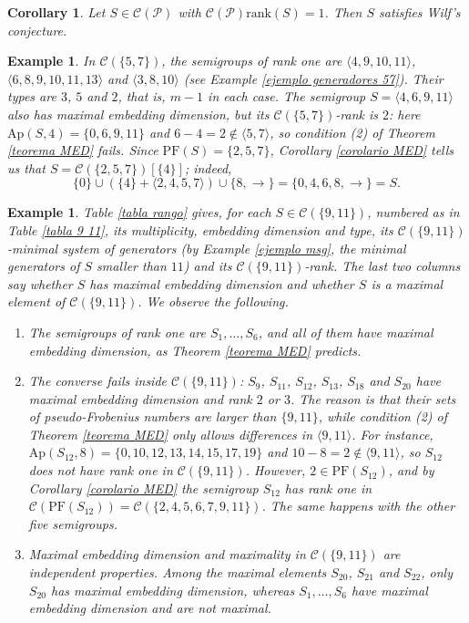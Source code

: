 \documentclass[11pt]{article}
\newtheorem{corollary}[theorem]{Corollary}
\newtheorem{example}[theorem]{Example}
\numberwithin{equation}{section}
\newcommand{\CP}{\mathcal C(\mathcal P)}
\newcommand{\rk}{\mathrm{rank}}
\newcommand{\Ap}{\mathrm{Ap}}
\newcommand{\PF}{\mathrm{PF}}
\begin{document}
\begin{corollary}\label{corolario Wilf}
Let $S\in\CP$ with $\CP\rk(S)=1$. Then $S$ satisfies Wilf's conjecture.
\end{corollary}

\begin{example}\label{ejemplo rango uno 57}
In $\mathcal C(\{5,7\})$, the semigroups of rank one are $\langle 4,9,10,11\rangle$, $\langle 6,8,9,10,11,13\rangle$ and $\langle 3,8,10\rangle$ (see Example \ref{ejemplo generadores 57}). Their types are $3$, $5$ and $2$, that is, $m-1$ in each case. The semigroup $S=\langle 4,6,9,11\rangle$ also has maximal embedding dimension, but its $\mathcal C(\{5,7\})$-rank is $2$: here $\Ap(S,4)=\{0,6,9,11\}$ and $6-4=2\notin\langle 5,7\rangle$, so condition (2) of Theorem \ref{teorema MED} fails. Since $\PF(S)=\{2,5,7\}$, Corollary \ref{corolario MED} tells us that $S=\mathcal C(\{2,5,7\})[\{4\}]$; indeed,
\[
\{0\}\cup(\{4\}+\langle 2,4,5,7\rangle)\cup\{8,\rightarrow\}=\{0,4,6,8,\rightarrow\}=S.
\]
\end{example}

\begin{example}\label{ejemplo tabla rango}
Table \ref{tabla rango} gives, for each $S\in\mathcal C(\{9,11\})$, numbered as in Table \ref{tabla 9 11}, its multiplicity, embedding dimension and type, its $\mathcal C(\{9,11\})$-minimal system of generators (by Example \ref{ejemplo msg}, the minimal generators of $S$ smaller than $11$) and its $\mathcal C(\{9,11\})$-rank. The last two columns say whether $S$ has maximal embedding dimension and whether $S$ is a maximal element of $\mathcal C(\{9,11\})$.
 We observe the following.
\begin{enumerate}
\item The semigroups of rank one are $S_1,\ldots,S_6$, and all of them have maximal embedding dimension, as Theorem \ref{teorema MED} predicts.
\item The converse fails inside $\mathcal C(\{9,11\})$: $S_9$, $S_{11}$, $S_{12}$, $S_{13}$, $S_{18}$ and $S_{20}$ have maximal embedding dimension and rank $2$ or $3$. The reason is that their sets of pseudo-Frobenius numbers are larger than $\{9,11\}$, while condition (2) of Theorem \ref{teorema MED} only allows differences in $\langle 9,11\rangle$. For instance, $\Ap(S_{12},8)=\{0,10,12,13,14,15,17,19\}$ and $10-8=2\notin\langle 9,11\rangle$, so $S_{12}$ does not have rank one in $\mathcal C(\{9,11\})$. However, $2\in\PF(S_{12})$, and by Corollary \ref{corolario MED} the semigroup $S_{12}$ has rank one in $\mathcal C(\PF(S_{12}))=\mathcal C(\{2,4,5,6,7,9,11\})$. The same happens with the other five semigroups.
\item Maximal embedding dimension and maximality in $\mathcal C(\{9,11\})$ are independent properties. Among the maximal elements $S_{20}$, $S_{21}$ and $S_{22}$, only $S_{20}$ has maximal embedding dimension, whereas $S_1,\ldots,S_6$ have maximal embedding dimension and are not maximal.
\end{enumerate}
\end{example}
\end{document}

